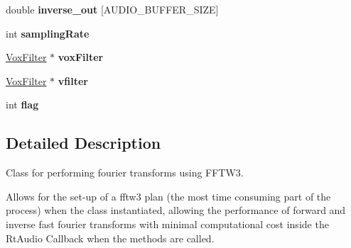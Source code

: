 \begin{DoxyCompactItemize}
\item 
\hypertarget{classfft_a290d4177db41a835118d5e0003ec7e2f}{double {\bfseries inverse\-\_\-out} \mbox{[}A\-U\-D\-I\-O\-\_\-\-B\-U\-F\-F\-E\-R\-\_\-\-S\-I\-Z\-E\mbox{]}}\label{classfft_a290d4177db41a835118d5e0003ec7e2f}

\item 
\hypertarget{classfft_add70853a9fc0ac681a974a8e1a40dfd8}{int {\bfseries sampling\-Rate}}\label{classfft_add70853a9fc0ac681a974a8e1a40dfd8}

\item 
\hypertarget{classfft_a3eda9964a8016b8683b5b5581fb90636}{\hyperlink{classVoxFilter}{Vox\-Filter} $\ast$ {\bfseries vox\-Filter}}\label{classfft_a3eda9964a8016b8683b5b5581fb90636}

\item 
\hypertarget{classfft_a46fd389fd4116e85af557fd191326586}{\hyperlink{classVoxFilter}{Vox\-Filter} $\ast$ {\bfseries vfilter}}\label{classfft_a46fd389fd4116e85af557fd191326586}

\item 
\hypertarget{classfft_a66afecdbae4bef314698644fc3f280de}{int {\bfseries flag}}\label{classfft_a66afecdbae4bef314698644fc3f280de}

\end{DoxyCompactItemize}


\subsection{Detailed Description}
Class for performing fourier transforms using F\-F\-T\-W3. 

Allows for the set-\/up of a fftw3 plan (the most time consuming part of the process) when the class instantiated, allowing the performance of forward and inverse fast fourier transforms with minimal computational cost inside the Rt\-Audio Callback when the methods are called. 

